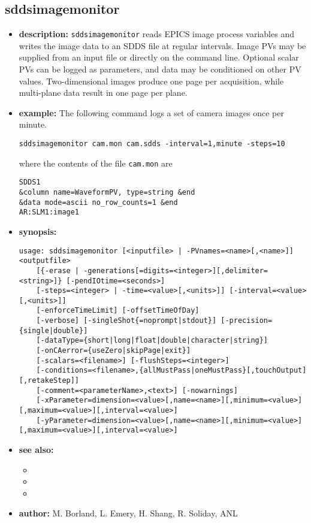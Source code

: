 %
%
\begin{latexonly}
\newpage
\end{latexonly}

%
%
\subsection{sddsimagemonitor}
\label{sddsimagemonitor}

\begin{itemize}
\item {\bf description:}
\verb+sddsimagemonitor+ reads EPICS image process variables and writes the image
  data to an SDDS file at regular intervals. Image PVs may be supplied from an
  input file or directly on the command line. Optional scalar PVs can be logged as
  parameters, and data may be conditioned on other PV values. Two-dimensional
  images produce one page per acquisition, while multi-plane data result in one
  page per plane.
\item {\bf example:}
The following command logs a set of camera images once per minute.
\begin{verbatim}
sddsimagemonitor cam.mon cam.sdds -interval=1,minute -steps=10
\end{verbatim}
where the contents of the file \verb+cam.mon+ are
\begin{verbatim}
SDDS1
&column name=WaveformPV, type=string &end
&data mode=ascii no_row_counts=1 &end
AR:SLM1:image1
\end{verbatim}
\item {\bf synopsis:}
\begin{verbatim}
usage: sddsimagemonitor [<inputfile> | -PVnames=<name>[,<name>]] <outputfile>
    [{-erase | -generations[=digits=<integer>][,delimiter=<string>]} [-pendIOtime=<seconds>]
    [-steps=<integer> | -time=<value>[,<units>]] [-interval=<value>[,<units>]]
    [-enforceTimeLimit] [-offsetTimeOfDay]
    [-verbose] [-singleShot{=noprompt|stdout}] [-precision={single|double}]
    [-dataType={short|long|float|double|character|string}]
    [-onCAerror={useZero|skipPage|exit}]
    [-scalars=<filename>] [-flushSteps=<integer>]
    [-conditions=<filename>,{allMustPass|oneMustPass}[,touchOutput][,retakeStep]]
    [-comment=<parameterName>,<text>] [-nowarnings]
    [-xParameter=dimension=<value>[,name=<name>][,minimum=<value>][,maximum=<value>][,interval=<value>]
    [-yParameter=dimension=<value>[,name=<name>][,minimum=<value>][,maximum=<value>][,interval=<value>]
\end{verbatim}
\item {\bf see also:}
  \begin{itemize}
  \item {}
  \item {}
  \item {}
  \end{itemize}
\item {\bf author:} M. Borland, L. Emery, H. Shang, R. Soliday, ANL
\end{itemize}
